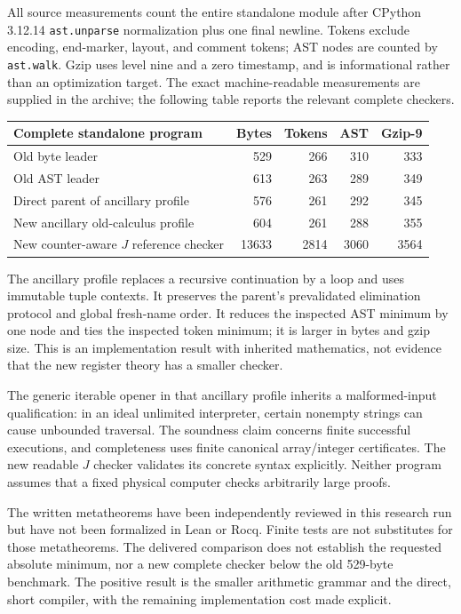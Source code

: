\documentclass[11pt,letterpaper]{article}
\theoremstyle{definition}\newtheorem{definition}[theorem]{Definition}
\theoremstyle{remark}\newtheorem{remark}[theorem]{Remark}
\newcommand{\file}[1]{{\small\nolinkurl{#1}}}
\begin{document}
All source measurements count the entire standalone module after
CPython 3.12.14 \file{ast.unparse} normalization plus one final
newline. Tokens exclude encoding, end-marker, layout, and comment
tokens; AST nodes are counted by \file{ast.walk}. Gzip uses level nine
and a zero timestamp, and is informational rather than an optimization
target. The exact machine-readable measurements are supplied in the
archive; the following table reports the relevant complete checkers.

\begin{center}\small
\begin{tabular}{@{}lrrrr@{}}
\toprule
Complete standalone program & Bytes & Tokens & AST & Gzip-9\\
\midrule
Old byte leader &529&266&310&333\\
Old AST leader &613&263&289&349\\
Direct parent of ancillary profile &576&261&292&345\\
New ancillary old-calculus profile &604&261&288&355\\
New counter-aware $J$ reference checker &13633&2814&3060&3564\\
\bottomrule
\end{tabular}
\end{center}

The ancillary profile replaces a recursive continuation by a loop and
uses immutable tuple contexts. It preserves the parent's prevalidated
elimination protocol and global fresh-name order. It reduces the
inspected AST minimum by one node and ties the inspected token minimum;
it is larger in bytes and gzip size. This is an implementation result
with inherited mathematics, not evidence that the new register theory
has a smaller checker.

The generic iterable opener in that ancillary profile inherits a
malformed-input qualification: in an ideal unlimited interpreter,
certain nonempty strings can cause unbounded traversal. The soundness
claim concerns finite successful executions, and completeness uses
finite canonical array/integer certificates. The new readable $J$
checker validates its concrete syntax explicitly. Neither program
assumes that a fixed physical computer checks arbitrarily large proofs.

The written metatheorems have been independently reviewed in this
research run but have not been formalized in Lean or Rocq. Finite tests
are not substitutes for those metatheorems. The delivered comparison
does not establish the requested absolute minimum, nor a new complete
checker below the old 529-byte benchmark. The positive result is the
smaller arithmetic grammar and the direct, short compiler, with the
remaining implementation cost made explicit.
\end{document}
